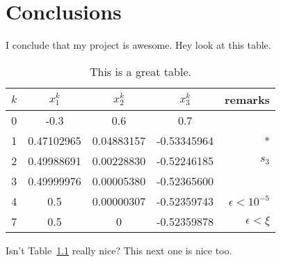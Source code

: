 \documentclass[12pt]{report}
\begin{document}













\chapter{Conclusions}

I conclude that my project is awesome.  Hey look at this table.
\begin{table}[htb]
\begin{center}
\begin{tabular}{|c|ccc|r|}
	\hline
$k$ &  $x_1^k$    &   $x_2^k$  & $x_3^k$   & remarks  \\
	\hline
0   & -0.3 & 0.6 & 0.7  &  \\
1   & 0.47102965 & 0.04883157 & -0.53345964  & *\\
2   & 0.49988691 & 0.00228830 & -0.52246185 & $s_3$ \\
3   & 0.49999976 & 0.00005380 & -0.52365600  & \\
4   & 0.5 & 0.00000307 & -0.52359743  & $\epsilon < 10^{-5}$ \\
7   & 0.5 & 0 & -0.52359878  & $\epsilon < \xi $ \\
	\hline
\end{tabular}
\caption{This is a great table.}
\label{greatTable}
\end{center}
\end{table}

Isn't Table~\ref{greatTable} really nice?  This next one is nice too.
\end{document}
